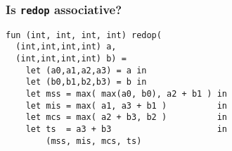 \begin{frame}

\frametitle{Is \texttt{redop} associative?}

\begin{verbatim}
fun (int, int, int, int) redop(
  (int,int,int,int) a, 
  (int,int,int,int) b) =
    let (a0,a1,a2,a3) = a in
    let (b0,b1,b2,b3) = b in
    let mss = max( max(a0, b0), a2 + b1 ) in
    let mis = max( a1, a3 + b1 )          in
    let mcs = max( a2 + b3, b2 )          in
    let ts  = a3 + b3                     in
        (mss, mis, mcs, ts)
\end{verbatim}

\end{frame}

